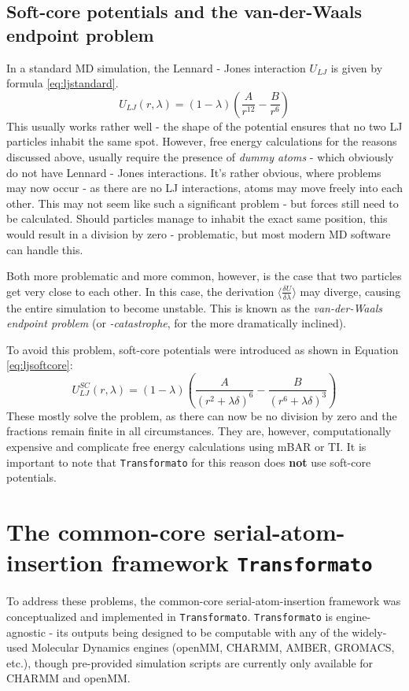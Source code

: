\documentclass[oneside]{scrreprt}
\begin{document}
\subsection{Soft-core potentials and the van-der-Waals endpoint problem}
In a standard MD simulation, the Lennard - Jones interaction $U_{LJ}$ is given by formula \ref{eq:ljstandard}.
\begin{equation}
U_{LJ}(r,\lambda)=(1-\lambda)(\frac{A}{r^{12}} - \frac{B}{r^6})
\label{eq:ljstandard}
\end{equation}
This usually works rather well -  the shape of the potential ensures that no two LJ particles inhabit the same spot. However, free energy calculations for the reasons discussed above, usually require the presence of \textit{dummy atoms} - which obviously do not have Lennard - Jones interactions. It's rather obvious, where problems may now occur -  as there are no LJ interactions, atoms may move freely into each other. This may not seem like such a significant problem - but forces still need to be calculated. Should particles manage to inhabit the exact same position, this would result in a division by zero - problematic, but most modern MD software can handle this. 

Both more problematic and more common, however, is the case that two particles get very close to each other. In this case, the derivation $\langle \frac{\delta U}{\delta\lambda} \rangle$ may diverge, causing the entire simulation to become unstable. This is known as the \textit{van-der-Waals endpoint problem} (or \textit{-catastrophe}, for the more dramatically inclined).

To avoid this problem, soft-core potentials were introduced as shown in Equation \ref{eq:ljsoftcore}\cite{Beutler1994Jun}:
\begin{equation}
U_{LJ}^{SC}(r,\lambda)=(1-\lambda)(\frac{A}{(r^2 +\lambda \delta)^6 }-\frac{B}{(r^6 +\lambda \delta)^3})
\label{eq:ljsoftcore}
\end{equation}
These mostly solve the problem, as there can now be no division by zero and the fractions remain finite in all circumstances. They are, however, computationally expensive and complicate free energy calculations using mBAR or TI\cite{Li2020Aug}. It is important to note that \texttt{Transformato} for this reason does \textbf{not} use soft-core potentials.


\section{The common-core serial-atom-insertion framework {\texttt{Transformato}}}
To address these problems, the common-core serial-atom-insertion framework was conceptualized and implemented in \texttt{Transformato}. \texttt{Transformato} is engine-agnostic - its outputs being designed to be computable with any of the widely-used Molecular Dynamics engines (openMM, CHARMM, AMBER, GROMACS, etc.), though pre-provided simulation scripts are currently only available for CHARMM and openMM.
\end{document}
